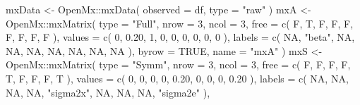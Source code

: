 \documentclass[
]{book}
\newenvironment{Shaded}{\begin{snugshade}}{\end{snugshade}}
\newcommand{\AttributeTok}[1]{\textcolor[rgb]{0.77,0.63,0.00}{#1}}
\newcommand{\ConstantTok}[1]{\textcolor[rgb]{0.00,0.00,0.00}{#1}}
\newcommand{\DecValTok}[1]{\textcolor[rgb]{0.00,0.00,0.81}{#1}}
\newcommand{\FloatTok}[1]{\textcolor[rgb]{0.00,0.00,0.81}{#1}}
\newcommand{\FunctionTok}[1]{\textcolor[rgb]{0.00,0.00,0.00}{#1}}
\newcommand{\NormalTok}[1]{#1}
\newcommand{\OtherTok}[1]{\textcolor[rgb]{0.56,0.35,0.01}{#1}}
\newcommand{\SpecialCharTok}[1]{\textcolor[rgb]{0.00,0.00,0.00}{#1}}
\newcommand{\StringTok}[1]{\textcolor[rgb]{0.31,0.60,0.02}{#1}}
\theoremstyle{definition}
\theoremstyle{definition}
\theoremstyle{definition}
\theoremstyle{remark}
\begin{document}
\begin{Shaded}
\begin{Highlighting}[]
\NormalTok{mxData }\OtherTok{\textless{}{-}}\NormalTok{ OpenMx}\SpecialCharTok{::}\FunctionTok{mxData}\NormalTok{(}
  \AttributeTok{observed =}\NormalTok{ df,}
  \AttributeTok{type =} \StringTok{"raw"}
\NormalTok{)}
\NormalTok{mxA }\OtherTok{\textless{}{-}}\NormalTok{ OpenMx}\SpecialCharTok{::}\FunctionTok{mxMatrix}\NormalTok{(}
  \AttributeTok{type =} \StringTok{"Full"}\NormalTok{,}
  \AttributeTok{nrow =} \DecValTok{3}\NormalTok{,}
  \AttributeTok{ncol =} \DecValTok{3}\NormalTok{,}
  \AttributeTok{free =} \FunctionTok{c}\NormalTok{(}
\NormalTok{    F, T, F,}
\NormalTok{    F, F, F,}
\NormalTok{    F, F, F}
\NormalTok{  ),}
  \AttributeTok{values =} \FunctionTok{c}\NormalTok{(}
    \DecValTok{0}\NormalTok{, }\FloatTok{0.20}\NormalTok{, }\DecValTok{1}\NormalTok{,}
    \DecValTok{0}\NormalTok{, }\DecValTok{0}\NormalTok{, }\DecValTok{0}\NormalTok{,}
    \DecValTok{0}\NormalTok{, }\DecValTok{0}\NormalTok{, }\DecValTok{0}
\NormalTok{  ),}
  \AttributeTok{labels =} \FunctionTok{c}\NormalTok{(}
    \ConstantTok{NA}\NormalTok{, }\StringTok{"beta"}\NormalTok{, }\ConstantTok{NA}\NormalTok{,}
    \ConstantTok{NA}\NormalTok{, }\ConstantTok{NA}\NormalTok{, }\ConstantTok{NA}\NormalTok{,}
    \ConstantTok{NA}\NormalTok{, }\ConstantTok{NA}\NormalTok{, }\ConstantTok{NA}
\NormalTok{  ),}
  \AttributeTok{byrow =} \ConstantTok{TRUE}\NormalTok{,}
  \AttributeTok{name =} \StringTok{"mxA"}
\NormalTok{)}
\NormalTok{mxS }\OtherTok{\textless{}{-}}\NormalTok{ OpenMx}\SpecialCharTok{::}\FunctionTok{mxMatrix}\NormalTok{(}
  \AttributeTok{type =} \StringTok{"Symm"}\NormalTok{,}
  \AttributeTok{nrow =} \DecValTok{3}\NormalTok{,}
  \AttributeTok{ncol =} \DecValTok{3}\NormalTok{,}
  \AttributeTok{free =} \FunctionTok{c}\NormalTok{(}
\NormalTok{    F, F, F,}
\NormalTok{    F, T, F,}
\NormalTok{    F, F, T}
\NormalTok{  ),}
  \AttributeTok{values =} \FunctionTok{c}\NormalTok{(}
    \DecValTok{0}\NormalTok{, }\DecValTok{0}\NormalTok{, }\DecValTok{0}\NormalTok{,}
    \DecValTok{0}\NormalTok{, }\FloatTok{0.20}\NormalTok{, }\DecValTok{0}\NormalTok{,}
    \DecValTok{0}\NormalTok{, }\DecValTok{0}\NormalTok{, }\FloatTok{0.20}
\NormalTok{  ),}
  \AttributeTok{labels =} \FunctionTok{c}\NormalTok{(}
    \ConstantTok{NA}\NormalTok{, }\ConstantTok{NA}\NormalTok{, }\ConstantTok{NA}\NormalTok{,}
    \ConstantTok{NA}\NormalTok{, }\StringTok{"sigma2x"}\NormalTok{, }\ConstantTok{NA}\NormalTok{,}
    \ConstantTok{NA}\NormalTok{, }\ConstantTok{NA}\NormalTok{, }\StringTok{"sigma2e"}
\NormalTok{  ),}

\end{Highlighting}
\end{Shaded}
\end{document}
